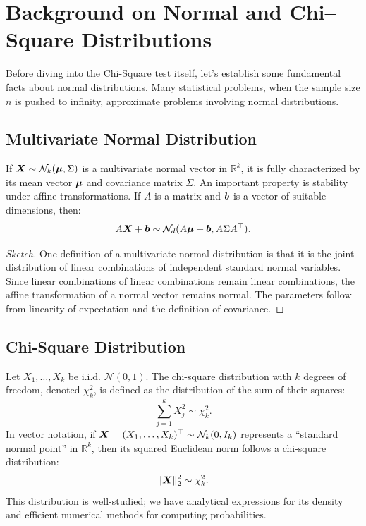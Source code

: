 \section{Background on Normal and Chi--Square Distributions}
\label{sec:Facts About Normal Distributions}

Before diving into the Chi-Square test itself, let's establish some fundamental facts about normal distributions. Many statistical problems, when the sample size $n$ is pushed to infinity, approximate problems involving normal distributions.

\subsection{Multivariate Normal Distribution}
If $\boldsymbol{X} \sim \mathcal{N}_{k}(\boldsymbol{\mu}, \Sigma)$ is a multivariate normal vector in $\mathbb{R}^{k}$, it is fully characterized by its mean vector $\boldsymbol{\mu}$ and covariance matrix $\Sigma$.
An important property is stability under affine transformations. If $A$ is a matrix and $\boldsymbol{b}$ is a vector of suitable dimensions, then:
\[
    A\boldsymbol{X} + \boldsymbol{b} \sim \mathcal{N}_{d}(A \boldsymbol{\mu} + \boldsymbol{b}, A \Sigma A^{\top}).
\]
\begin{proof}[Sketch]
One definition of a multivariate normal distribution is that it is the joint distribution of linear combinations of independent standard normal variables. Since linear combinations of linear combinations remain linear combinations, the affine transformation of a normal vector remains normal. The parameters follow from linearity of expectation and the definition of covariance.
\end{proof}

\subsection{Chi-Square Distribution}
Let $X_1, \dots, X_{k}$ be i.i.d. $\mathcal{N}(0,1)$. The chi-square distribution with $k$ degrees of freedom, denoted $\chi^2_{k}$, is defined as the distribution of the sum of their squares:
\[
    \sum_{j=1}^{k} X^2_{j} \sim \chi^2_{k}.
\]
In vector notation, if $\boldsymbol{X} = (X_1, \dots, X_{k})^{\top} \sim \mathcal{N}_{k}(0, I_{k})$ represents a ``standard normal point'' in $\mathbb{R}^{k}$, then its squared Euclidean norm follows a chi-square distribution:
\[
    \|\boldsymbol{X}\|^2_{2} \sim \chi^2_{k}.
\]
This distribution is well-studied; we have analytical expressions for its density and efficient numerical methods for computing probabilities.

